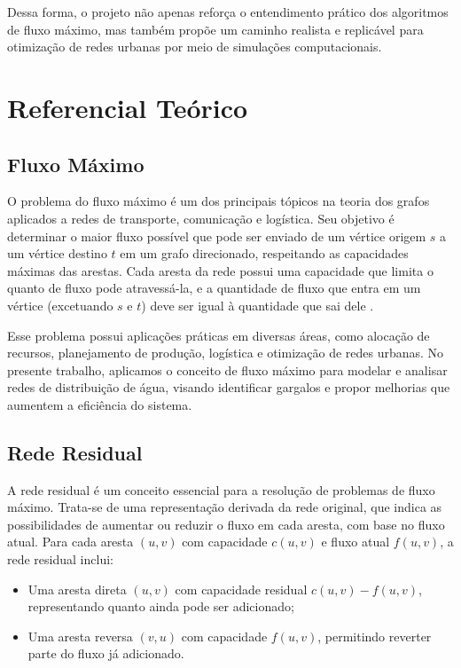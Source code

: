 \documentclass[12pt]{article}
\begin{document}
Dessa forma, o projeto não apenas reforça o entendimento prático dos algoritmos de fluxo máximo, mas também propõe um caminho realista e replicável para otimização de redes urbanas por meio de simulações computacionais.


\section{Referencial Teórico}

\subsection{Fluxo Máximo}

O problema do fluxo máximo é um dos principais tópicos na teoria dos grafos aplicados a redes de transporte, comunicação e logística. Seu objetivo é determinar o maior fluxo possível que pode ser enviado de um vértice origem \( s \) a um vértice destino \( t \) em um grafo direcionado, respeitando as capacidades máximas das arestas. Cada aresta da rede possui uma capacidade que limita o quanto de fluxo pode atravessá-la, e a quantidade de fluxo que entra em um vértice (excetuando \( s \) e \( t \)) deve ser igual à quantidade que sai dele \cite{ahuja1993network}.

Esse problema possui aplicações práticas em diversas áreas, como alocação de recursos, planejamento de produção, logística e otimização de redes urbanas. No presente trabalho, aplicamos o conceito de fluxo máximo para modelar e analisar redes de distribuição de água, visando identificar gargalos e propor melhorias que aumentem a eficiência do sistema.

\subsection{Rede Residual}

A rede residual é um conceito essencial para a resolução de problemas de fluxo máximo. Trata-se de uma representação derivada da rede original, que indica as possibilidades de aumentar ou reduzir o fluxo em cada aresta, com base no fluxo atual. Para cada aresta \( (u, v) \) com capacidade \( c(u, v) \) e fluxo atual \( f(u, v) \), a rede residual inclui:

\begin{itemize}
  \item Uma aresta direta \( (u, v) \) com capacidade residual \( c(u, v) - f(u, v) \), representando quanto ainda pode ser adicionado;
  \item Uma aresta reversa \( (v, u) \) com capacidade \( f(u, v) \), permitindo reverter parte do fluxo já adicionado.
\end{itemize}
\end{document}
